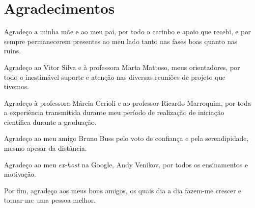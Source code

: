 
\dedication{Dedico esse trabalho aos meus pais, que sempre me apoiaram em tudo o que realizei.}

\chapter*{Agradecimentos}

Agradeço a minha mãe e ao meu pai, por todo o carinho e apoio que recebi, e por sempre permanecerem presentes ao meu lado tanto nas fases boas quanto nas ruins.

Agradeço ao Vitor Silva e à professora Marta Mattoso, meus orientadores, por todo o inestimável suporte e atenção nas diversas reuniões de projeto que tivemos.

Agradeço à professora Márcia Cerioli e ao professor Ricardo Marroquim, por toda a experiência transmitida durante meu período de realização de iniciação científica durante a graduação.

Agradeço ao meu amigo Bruno Buss pelo voto de confiança e pela serendipidade, mesmo apesar da distância.

Agradeço ao meu \textit{ex-host} na Google, Andy Venikov, por todos os ensinamentos e motivação.

Por fim, agradeço aos meus bons amigos, os quais dia a dia fazem-me crescer e tornar-me uma pessoa melhor.